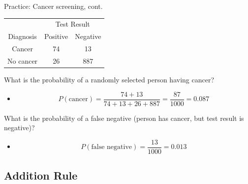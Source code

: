 \documentclass[xcolor=table]{beamer}
\begin{document}
\begin{frame}{Practice: Cancer screening, cont.}
\begin{block}{}
{\centering
\begin{tabular}{c | c  c }
\multicolumn{1}{c}{} & \multicolumn{2}{c}{Test Result}\\
Diagnosis & Positive & Negative \\
\hline
Cancer & 74 & 13 \\
No cancer & 26 & 887\\
\end{tabular}\par
}
\end{block}

\begin{exampleblock}{}
What is the probability of a randomly selected person having cancer?
\begin{itemize}
\pause
\item \[P(\text{cancer}) = \frac {74 + 13}{74+13+26+887} = \frac {87}{1000} = 0.087\]
\end{itemize}

\pause
What is the probability of a false negative (person has cancer, but test result is negative)?
\begin{itemize}
\pause
\item \[ P(\text{false negative}) = \frac {13}{1000} = 0.013\]
\end{itemize}
\end{exampleblock}
\end{frame}

\subsection{Addition Rule}
\end{document}
